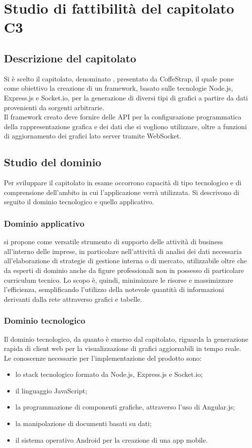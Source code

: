 \section{Studio di fattibilità del capitolato C3}
	\subsection{Descrizione del capitolato}
		Si è scelto il capitolato, denominato \projectname, presentato da CoffeStrap, il quale pone come obiettivo la creazione di un framework, basato sulle tecnologie Node.js, Express.js e Socket.io, per la generazione di diversi tipi di grafici a partire da dati provenienti da sorgenti arbitrarie.\\
		Il framework creato deve fornire delle API per la configurazione programmatica della rappresentazione grafica e dei dati che si vogliono utilizzare, oltre a funzioni di aggiornamento dei grafici lato server tramite WebSocket.
	\subsection{Studio del dominio}
		Per sviluppare il capitolato in esame occorrono capacità di tipo tecnologico e di comprensione dell'ambito in cui l'applicazione verrà utilizzata. Si descrivono di seguito il dominio tecnologico e quello applicativo.
		\subsubsection{Dominio applicativo}
			\projectname si propone come versatile strumento di supporto delle attività di business all'interno delle imprese, in particolare nell'attività di analisi dei dati necessaria all'elaborazione di strategie di gestione interna o di mercato, utilizzabile oltre che da esperti di dominio anche da figure professionali non in possesso di particolare curriculum tecnico. Lo scopo è, quindi, minimizzare le risorse e massimizzare l'efficienza, semplificando l'utilizzo della notevole quantità di informazioni derivanti dalla rete attraverso grafici e tabelle.
		\subsubsection{Dominio tecnologico}
			Il dominio tecnologico, da quanto è emerso dal capitolato, riguarda la generazione rapida di client web per la visualizzazione di grafici aggiornabili in tempo reale.\\
			Le conoscenze necessarie per l'implementazione del prodotto sono:
			\begin{itemize}
				\item lo stack tecnologico formato da Node.js, Express.js e Socket.io;
				\item il linguaggio JavaScript;
				\item la programmazione di componenti grafiche, attraverso l'uso di Angular.js;
				\item la manipolazione di documenti basati su dati;
				\item il sistema operativo Android per la creazione di una app mobile.
			\end{itemize}
